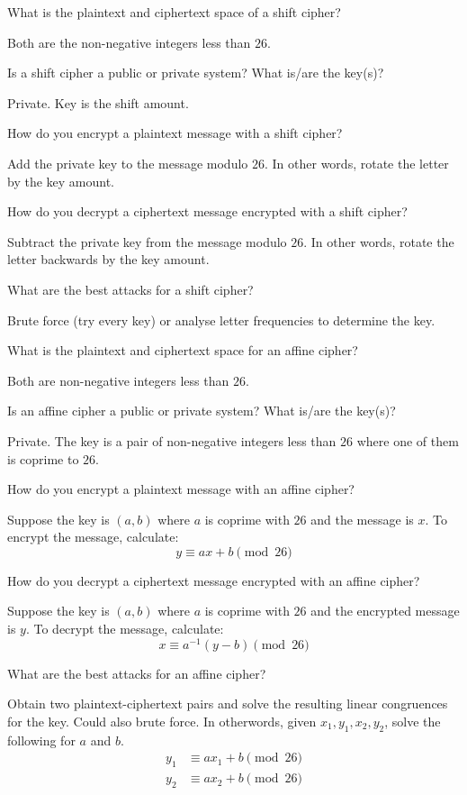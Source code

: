 \documentclass{article}
\newcounter{qcounter}
\newcommand{\showqcounter}{\theqcounter}
\newcommand{\question}{\vspace{5mm}\addtocounter{qcounter}{1}\vspace{5mm}{\bf Q\showqcounter: }}
\newcommand{\answer}{\vspace{5mm}{\bf A\showqcounter: }}
\begin{document}
\question What is the plaintext and ciphertext space of a shift cipher?

\answer Both are the non-negative integers less than $26$.


\question Is a shift cipher a public or private system? What is/are the key(s)?

\answer Private. Key is the shift amount.


\question How do you encrypt a plaintext message with a shift cipher?

\answer Add the private key to the message modulo $26$. In other words, rotate the letter by the key amount.


\question How do you decrypt a ciphertext message encrypted with a shift cipher?

\answer Subtract the private key from the message modulo $26$. In other words, rotate the letter backwards by the key amount.


\question What are the best attacks for a shift cipher?

\answer Brute force (try every key) or analyse letter frequencies to determine the key.


\question What is the plaintext and ciphertext space for an affine cipher?

\answer Both are non-negative integers less than $26$.


\question Is an affine cipher a public or private system? What is/are the key(s)?

\answer Private. The key is a pair of non-negative integers less than $26$ where one of them is coprime to $26$.


\question How do you encrypt a plaintext message with an affine cipher?

\answer Suppose the key is $(a, b)$ where $a$ is coprime with $26$ and the message is $x$. To encrypt the message, calculate:
  $$
    y \equiv ax + b \pmod{26}
  $$


\question How do you decrypt a ciphertext message encrypted with an affine cipher?

\answer Suppose the key is $(a, b)$ where $a$ is coprime with $26$ and the encrypted message is $y$. To decrypt the message, calculate: 
  $$
    x \equiv a^{-1}(y - b) \pmod{26}
  $$

\question What are the best attacks for an affine cipher?

\answer Obtain two plaintext-ciphertext pairs and solve the resulting linear congruences for the key. Could also brute force.
  In otherwords, given $x_1, y_1, x_2, y_2$, solve the following for $a$ and $b$.
  \begin{align*}
    y_1 &\equiv ax_1 + b \pmod{26}\\
    y_2 &\equiv ax_2 + b \pmod{26}
  \end{align*}
\end{document}
